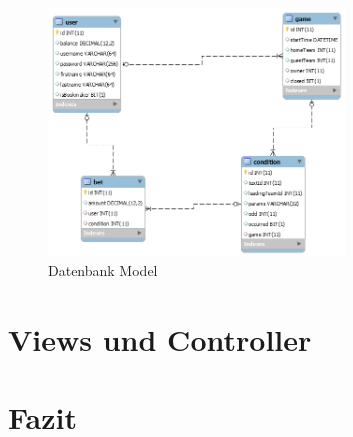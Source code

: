 \documentclass[a4paper, abstracton]{scrartcl}
\begin{document}
  \begin{figure}[h!]
  \begin{center}
    \includegraphics[width=0.7\textwidth]{images/db_model.png}
  \end{center}
  \caption{Datenbank Model}
  \label{fig:db_model}
\end{figure}

\section{Views und Controller}

\section{Fazit}


\pagebreak
\listoffigures		%

\pagebreak	%


\pagebreak


\pagebreak	
\end{document}
